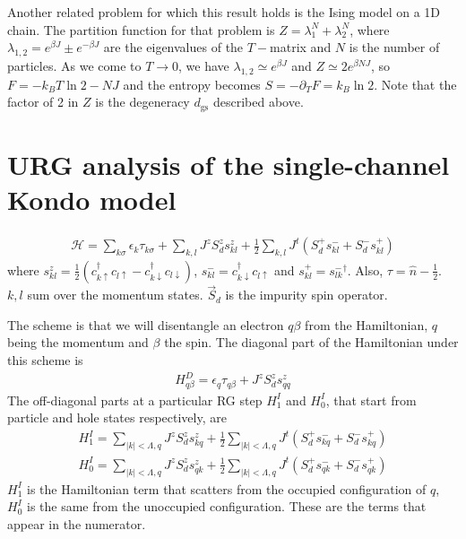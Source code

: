 \documentclass{revtex4-2}
\numberwithin{equation}{section}
\begin{document}
Another related problem for which this result holds is the Ising model on a 1D chain. The partition function for that problem is \(Z = \lambda_1^N + \lambda_2^N\), where \(\lambda_{1,2} = e^{\beta J} \pm e^{-\beta J} \) are the eigenvalues of the \(T-\)matrix and \(N\) is the number of particles. As we come to \(T \to 0\), we have \(\lambda_{1,2} \simeq e^{\beta J}\) and \(Z \simeq 2 e^{\beta N J}\), so \(F = -k_B T \ln 2 - N J\) and the entropy becomes \(S = - \partial_T F = k_B \ln 2\). Note that the factor of 2 in \(Z\) is the degeneracy \(d_\text{gs}\) described above.

\clearpage
\appendix
\section{URG analysis of the single-channel Kondo model}
\label{1KondoURG}
\begin{equation}\begin{aligned}
	\mathcal{H} = \sum_{k\sigma}\epsilon_{k}\tau_{k\sigma} + \sum_{k,l} J^z S_d^z s^z_{kl} + \frac{1}{2}\sum_{k,l} J^t \left(S_d^+ s^-_{kl}  + S_d^- s^+_{kl}\right)
\end{aligned}\end{equation}
where \(s^z_{kl} = \frac{1}{2}\left(c^\dagger_{k\uparrow}c_{l \uparrow} - c^\dagger_{k\downarrow}c_{l \downarrow}\right)\), \(s^-_{kl} = c^\dagger_{k \downarrow}c_{l \uparrow}\) and \(s^+_{kl} = {s^-_{lk}}^\dagger\). Also, \(\tau = \hat n - \frac{1}{2}\). \(k,l\) sum over the momentum states. \(\vec S_d\) is the impurity spin operator.

The scheme is that we will disentangle an electron \(q\beta\) from the Hamiltonian, \(q\) being the momentum and \(\beta\) the spin. The diagonal part of the Hamiltonian under this scheme is
\begin{equation}\begin{aligned}
\label{kondodiag}
H^D_{q\beta} = \epsilon_q \tau_{q\beta} + J^z S_d^z s_{qq}^z
\end{aligned}\end{equation}
The off-diagonal parts at a particular RG step \(H^I_1\) and \(H^I_0\), that start from particle and hole states respectively, are
\begin{equation}\begin{aligned}
	H^I_1 = \sum_{|k|<\Lambda,q} J^z S_d^z s^z_{kq} + \frac{1}{2}\sum_{|k|<\Lambda,q} J^t \left(S_d^+ s^-_{kq} + S_d^- s^+_{kq}\right)\\
	H^I_0 = \sum_{|k|<\Lambda,q} J^z S_d^z s^z_{qk} + \frac{1}{2}\sum_{|k|<\Lambda,q} J^t \left(S_d^+ s^-_{qk}  + S_d^- s^+_{qk}\right)
\end{aligned}\end{equation}
\(H^I_1\) is the Hamiltonian term that scatters from the occupied configuration of \(q\), \(H^I_0\) is the same from the unoccupied configuration.
These are the terms that appear in the numerator.
\end{document}
